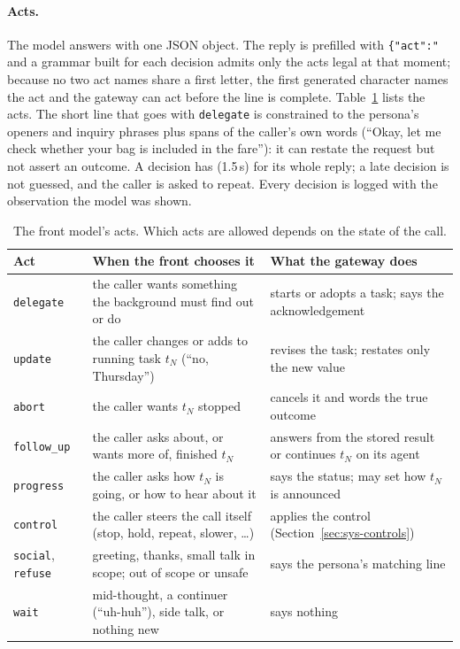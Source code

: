 \paragraph{Acts.}
The model answers with one JSON object. The reply is prefilled with \verb|{"act":"| and a grammar built for each decision
admits only the acts legal at that moment; because no two act names share a first letter, the first generated character
names the act and the gateway can act before the line is complete. Table~\ref{tab:acts} lists the acts. The short line
that goes with \texttt{delegate} is constrained to the persona's openers and inquiry phrases plus spans of the caller's own
words (``Okay, let me check whether your bag is included in the fare''): it can restate the request but not assert an
outcome. A decision has  (1.5\,s) for its whole reply; a late decision is not guessed, and the
caller is asked to repeat. Every decision is logged with the observation the model was shown.

\begin{table}[t]
\centering
\caption{The front model's acts. Which acts are allowed depends on the state of the call.}
\label{tab:acts}
\footnotesize
\begin{tabularx}{\textwidth}{@{}>{\raggedright\arraybackslash}p{1.9cm}>{\raggedright\arraybackslash}X>{\raggedright\arraybackslash}p{5.6cm}@{}}
\toprule
Act & When the front chooses it & What the gateway does \\
\midrule
\texttt{delegate} & the caller wants something the background must find out or do & starts or adopts a task; says the acknowledgement \\
\texttt{update} & the caller changes or adds to running task $t_N$ (``no, Thursday'') & revises the task; restates only the new value \\
\texttt{abort} & the caller wants $t_N$ stopped & cancels it and words the true outcome \\
\texttt{follow\_up} & the caller asks about, or wants more of, finished $t_N$ & answers from the stored result or continues $t_N$ on its agent \\
\texttt{progress} & the caller asks how $t_N$ is going, or how to hear about it & says the status; may set how $t_N$ is announced \\
\texttt{control} & the caller steers the call itself (stop, hold, repeat, slower, \ldots) & applies the control (Section~\ref{sec:sys-controls}) \\
\texttt{social}, \texttt{refuse} & greeting, thanks, small talk in scope; out of scope or unsafe & says the persona's matching line \\
\texttt{wait} & mid-thought, a continuer (``uh-huh''), side talk, or nothing new & says nothing \\
\bottomrule
\end{tabularx}
\end{table}

